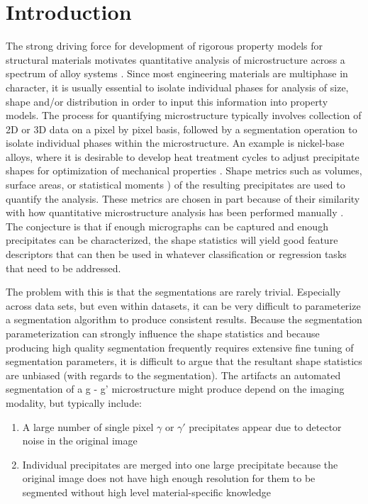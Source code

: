 \documentclass[review]{elsarticle}
\begin{document}
	\section{Introduction}
		The strong driving force for development of rigorous property models for structural materials motivates quantitative analysis of microstructure across a spectrum of alloy systems \cite{echlinlenthe}. Since most engineering materials are multiphase in character, it is usually essential to isolate individual phases for analysis of size, shape and/or distribution in order to input this information into property models. The process for quantifying microstructure typically involves collection of 2D or 3D data on a pixel by pixel basis, followed by a segmentation operation to isolate individual phases within the microstructure. An example is nickel-base alloys, where it is desirable to develop heat treatment cycles to adjust precipitate shapes for optimization of mechanical properties \cite{sluytman}. Shape metrics such as volumes, surface areas, or statistical moments \cite{twoDM, threeDM}) of the resulting precipitates are used to quantify the analysis. These metrics are chosen in part because of their similarity with how quantitative microstructure analysis has been performed manually \cite{sluytman, underwood}. The conjecture is that if enough micrographs can be captured and enough precipitates can be characterized, the shape statistics will yield good feature descriptors that can then be used in whatever classification or regression tasks that need to be addressed.

		The problem with this is that the segmentations are rarely trivial. Especially across data sets, but even within datasets, it can be very difficult to parameterize a segmentation algorithm to produce consistent results. Because the segmentation parameterization can strongly influence the shape statistics and because producing high quality segmentation frequently requires extensive fine tuning of segmentation parameters, it is difficult to argue that the resultant shape statistics are unbiased (with regards to the segmentation). The artifacts an automated segmentation of a g - g' microstructure might produce depend on the imaging modality, but typically include:

		\begin{enumerate}
			\item \label{prob1} A large number of single pixel $\gamma$ or $\gamma'$ precipitates appear due to detector noise in the original image
			\item Individual precipitates are merged into one large precipitate because the original image does not have high enough resolution for them to be segmented without high level material-specific knowledge
		\end{enumerate}
	
\end{document}
